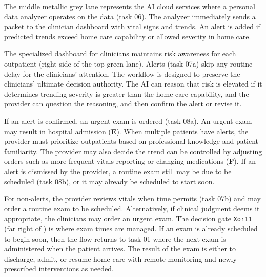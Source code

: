 The middle metallic grey lane represents the AI cloud services where a personal data analyzer operates on the data (task 06).  The analyzer immediately sends a packet to the clinician dashboard with vital signs and trends. An alert is added if predicted trends exceed home care capability or allowed severity in home care.

The specialized dashboard for clinicians maintains risk awareness for each outpatient (right side of the top green lane). Alerts (task 07a) skip any routine delay for the clinicians' attention. The workflow is designed to preserve the clinicians' ultimate decision authority. The AI can reason that risk is elevated if it determines trending severity is greater than the home care capability, and the provider can question the reasoning, and then confirm the alert or revise it. 

If an alert is confirmed, an urgent exam is ordered (task 08a). An urgent exam may result in hospital admission (\textbf{E}). When multiple patients have alerts, the provider must prioritize outpatients based on professional knowledge and patient familiarity. The provider may also decide the trend can be controlled by adjusting orders such as more frequent vitals reporting or changing medications (\textbf{F}). If an alert is dismissed by the provider, a routine exam still may be due to be scheduled (task 08b), or it may already be scheduled to start soon. 

For non-alerts, the provider reviews vitals when time permits (task 07b) and may order a routine exam to be scheduled. Alternatively, if clinical judgment deems it appropriate, the clinicians may order an urgent exam. The decision gate \texttt{Xor11} (far right of ) is where exam times are managed. If an exam is already scheduled to begin soon, then the flow returns to task 01 where the next exam is administered when the patient arrives. The result of the exam is either to discharge, admit, or resume home care with remote monitoring and newly prescribed interventions as needed.

\begin{comment}

It is not possible to manually reason about the correctness of the workflow models in taking actions on risk awareness given the concurrency in the workflow and the several asynchronous interactions with the risk awareness both to update the risk and make decisions on the risk. The adaptation of model checking to formally reason about the correctness of the system in an automated way is an important and novel contribution to verifying the functionality of joint human-computer teams. 

  The rest of this paper describes the verification of the workflow against the CWP as a verification requirement. The verification is accomplished with the SPIN model checker. 

The CWP in \figref{fig:cwp} is translated into equivalent Linear Temporal Logic (LTL), and the workflow in \figref{fig:bpmn} is translated into its equivalent Promela model, where Promela is the input language for SPIN. The SPIN model checker then verifies that the workflow in its current form does indeed implement the CWP.
\end{comment}